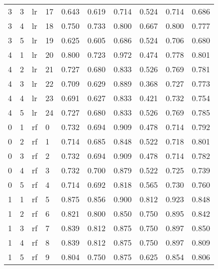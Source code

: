 \begin{tabular}{llllrrrrrr}
   3 &           3 &    lr &          17 & 0.643 &  0.619 &        0.714 &        0.524 & 0.714 & 0.686 \\
   3 &           4 &    lr &          18 & 0.750 &  0.733 &        0.800 &        0.667 & 0.800 & 0.777 \\
   3 &           5 &    lr &          19 & 0.625 &  0.605 &        0.686 &        0.524 & 0.706 & 0.680 \\
   4 &           1 &    lr &          20 & 0.800 &  0.723 &        0.972 &        0.474 & 0.778 & 0.801 \\
   4 &           2 &    lr &          21 & 0.727 &  0.680 &        0.833 &        0.526 & 0.769 & 0.781 \\
   4 &           3 &    lr &          22 & 0.709 &  0.629 &        0.889 &        0.368 & 0.727 & 0.773 \\
   4 &           4 &    lr &          23 & 0.691 &  0.627 &        0.833 &        0.421 & 0.732 & 0.754 \\
   4 &           5 &    lr &          24 & 0.727 &  0.680 &        0.833 &        0.526 & 0.769 & 0.785 \\
   0 &           1 &    rf &           0 & 0.732 &  0.694 &        0.909 &        0.478 & 0.714 & 0.792 \\
   0 &           2 &    rf &           1 & 0.714 &  0.685 &        0.848 &        0.522 & 0.718 & 0.801 \\
   0 &           3 &    rf &           2 & 0.732 &  0.694 &        0.909 &        0.478 & 0.714 & 0.782 \\
   0 &           4 &    rf &           3 & 0.732 &  0.700 &        0.879 &        0.522 & 0.725 & 0.739 \\
   0 &           5 &    rf &           4 & 0.714 &  0.692 &        0.818 &        0.565 & 0.730 & 0.760 \\
   1 &           1 &    rf &           5 & 0.875 &  0.856 &        0.900 &        0.812 & 0.923 & 0.848 \\
   1 &           2 &    rf &           6 & 0.821 &  0.800 &        0.850 &        0.750 & 0.895 & 0.842 \\
   1 &           3 &    rf &           7 & 0.839 &  0.812 &        0.875 &        0.750 & 0.897 & 0.850 \\
   1 &           4 &    rf &           8 & 0.839 &  0.812 &        0.875 &        0.750 & 0.897 & 0.809 \\
   1 &           5 &    rf &           9 & 0.804 &  0.750 &        0.875 &        0.625 & 0.854 & 0.806 \\

\end{tabular}
